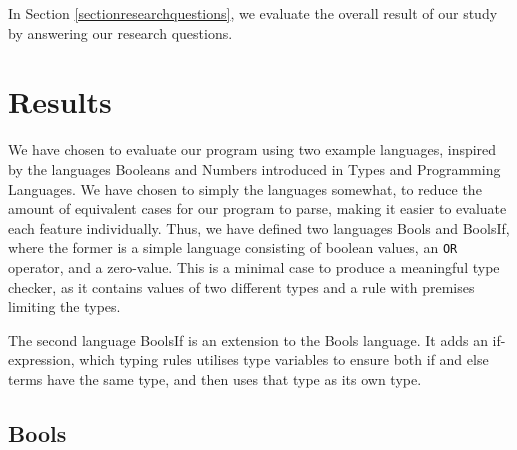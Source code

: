 \documentclass[nofilelist]{cslthse-msc}
\newcommand{\CR}[1]{\textcolor{green!60!black}{[\textbf{CR}:#1]}}
\begin{document}
In Section \ref{sectionresearchquestions}, we evaluate the overall result of our study by answering our research questions.
\section{Results} %
We have chosen to evaluate our program using two example languages, inspired by the languages Booleans and Numbers introduced in Types and Programming Languages\cite{Pierce}.
We have chosen to simply the languages somewhat, to reduce the amount of equivalent cases for our program to parse, making it easier to evaluate each feature individually.
Thus, we have defined two languages Bools and BoolsIf, where the former is a simple language consisting of boolean values, an \lstinline{OR} operator, and a zero-value.
This is a minimal case to produce a meaningful type checker, as it contains values of two different types and a rule with premises limiting the types.

The second language BoolsIf is an extension to the Bools language.
It adds an if-expression, which typing rules utilises type variables to ensure both if and else terms have the same type, and then uses that type as its own type.
\subsection{Bools}
\end{document}
